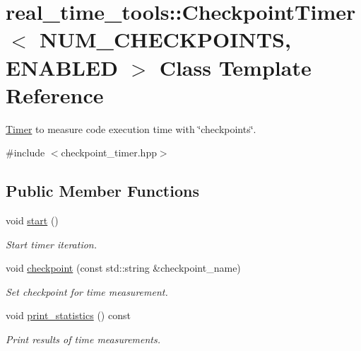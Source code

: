 \hypertarget{classreal__time__tools_1_1CheckpointTimer}{}\section{real\+\_\+time\+\_\+tools\+:\+:Checkpoint\+Timer$<$ N\+U\+M\+\_\+\+C\+H\+E\+C\+K\+P\+O\+I\+N\+TS, E\+N\+A\+B\+L\+ED $>$ Class Template Reference}
\label{classreal__time__tools_1_1CheckpointTimer}


\hyperlink{classreal__time__tools_1_1Timer}{Timer} to measure code execution time with \char`\"{}checkpoints\char`\"{}.  




{\ttfamily \#include $<$checkpoint\+\_\+timer.\+hpp$>$}

\subsection*{Public Member Functions}
\begin{DoxyCompactItemize}
\item 
\mbox{\label{classreal__time__tools_1_1CheckpointTimer_ad93a12cb74103528c8db4e7b1745eae6}} 
void \hyperlink{classreal__time__tools_1_1CheckpointTimer_ad93a12cb74103528c8db4e7b1745eae6}{start} ()
\begin{DoxyCompactList}\small\item\em Start timer iteration. \end{DoxyCompactList}\item 
void \hyperlink{classreal__time__tools_1_1CheckpointTimer_a6e91b61b72c433a220b1bddb7a634bf5}{checkpoint} (const std\+::string \&checkpoint\+\_\+name)
\begin{DoxyCompactList}\small\item\em Set checkpoint for time measurement. \end{DoxyCompactList}\item 
\mbox{\label{classreal__time__tools_1_1CheckpointTimer_a73e001fa40a76ce5fd917a2dfcd09555}} 
void \hyperlink{classreal__time__tools_1_1CheckpointTimer_a73e001fa40a76ce5fd917a2dfcd09555}{print\+\_\+statistics} () const
\begin{DoxyCompactList}\small\item\em Print results of time measurements. \end{DoxyCompactList}\end{DoxyCompactItemize}
